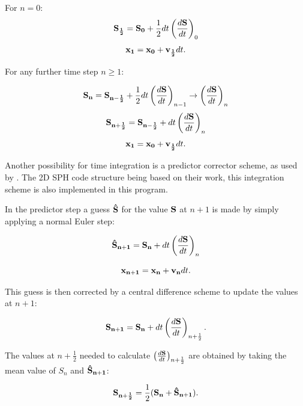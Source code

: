 \documentclass{report}
\begin{document}
For $n=0$:
\begin{equation}
{\bf S_{\frac{1}{2}}}={\bf S_0}+\frac{1}{2}dt\left(\frac{d{\bf S}}{dt}\right)_0
\end{equation}
\begin{equation}
{\bf x_1}={\bf x_0}+{\bf v_{\frac{1}{2}}}dt .
\end{equation}

For any further time step $n\ge1$:

\begin{equation}
{\bf S_n}={\bf S_{n-\frac{1}{2}}}+\frac{1}{2}dt\left(\frac{d{\bf S}}{dt}\right)_{n-1} \rightarrow
\left(\frac{d{\bf S}}{dt}\right)_n 
\end{equation}
\begin{equation}
{\bf S_{n+\frac{1}{2}}}={\bf S_{n-\frac{1}{2}}}+dt\left(\frac{d{\bf S}}{dt}\right)_n 
\end{equation}
\begin{equation}
{\bf x_1}={\bf x_0}+{\bf v_{\frac{1}{2}}}dt .
\end{equation}

Another possibility for time integration is a predictor corrector scheme, as
used by \cite{Hu2007}.
The 2D SPH code structure being based on their work,
this integration scheme is also implemented in this program.

In the predictor step a guess ${\bf \hat S}$ for the value ${\bf S}$ at $n+1$ is made by simply
applying a normal Euler step:

\begin{equation}
{\bf \hat S_{n+1}}={\bf S_n}+dt\left(\frac{d{\bf S}}{dt}\right)_n
\end{equation}

\begin{equation}
{\bf x_{n+1}}={\bf x_n}+ {\bf v_{n}}dt.
\end{equation}

This guess is then corrected by a central difference scheme to update the values at
$n+1$:

\begin{equation}
{\bf S_{n+1}}={\bf S_n}+dt\left(\frac{d{\bf S}}{dt}\right)_{n+\frac{1}{2}}.
\end{equation}

The values at $n+\frac{1}{2}$ needed to calculate
$\left(\frac{d{\bf S}}{dt}\right)_{n+\frac{1}{2}}$ are obtained by taking the mean value of
$S_n$ and ${\bf \hat S_{n+1}}$:

\begin{equation}
{\bf S_{n+\frac{1}{2}}}=\frac{1}{2}({\bf S_n}+{\bf \hat S_{n+1}}).
\end{equation}
\end{document}
